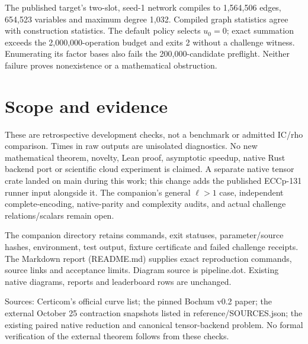 \documentclass[10pt]{article}
\begin{document}
The published target's two-slot, seed-1 network compiles to 1,564,506 edges,
654,523 variables and maximum degree 1,032. Compiled graph statistics agree
with construction statistics. The default policy selects $u_0=0$; exact
summation exceeds the 2,000,000-operation budget and exits 2 without a
challenge witness. Enumerating its factor bases also fails the 200,000-candidate
preflight. Neither failure proves nonexistence or a mathematical obstruction.

\section*{Scope and evidence}
These are retrospective development checks, not a benchmark or admitted
IC/rho comparison. Times in raw outputs are unisolated diagnostics.
No new mathematical theorem, novelty, Lean proof, asymptotic speedup, native
Rust backend port or scientific cloud experiment is claimed. A separate native
tensor crate landed on main during this work; this change adds the published
ECCp-131 runner input alongside it. The companion's general $\ell>1$ case,
independent complete-encoding, native-parity and complexity audits, and actual
challenge relations/scalars remain open.

The companion directory retains commands, exit statuses, parameter/source
hashes, environment, test output, fixture certificate and failed challenge
receipts. The Markdown report (README.md) supplies exact reproduction commands,
source links and acceptance limits. Diagram source is pipeline.dot. Existing
native diagrams, reports and leaderboard rows are unchanged.

Sources: Certicom's official curve list; the pinned Bochum v0.2 paper; the
external October 25 contraction snapshots listed in reference/SOURCES.json;
the existing paired native reduction and canonical tensor-backend problem.
No formal verification of the external theorem follows from these checks.
\end{document}
